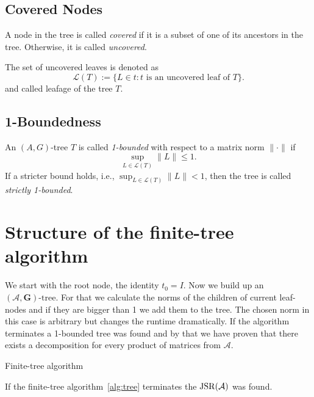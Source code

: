 \subsection*{Covered Nodes}
A node in the tree is called \textit{covered} if it is a subset of one of its ancestors in the tree. Otherwise, it is called \textit{uncovered}. 

\begin{definition}
    The set of uncovered leaves is denoted as
\[
    \mathcal{L}(T) := \{ L \in t : t \text{ is an uncovered leaf of } T \}.
\]
and called leafage of the tree $T$.
\end{definition}

\subsection*{1-Boundedness}
An \( (A,G) \)-tree $T$ is called \textit{1-bounded} with respect to a matrix norm \( \| \cdot \| \) if
\[
    \sup_{L \in \mathcal{L}(T)} \| L \| \leq 1.
\]
If a stricter bound holds, i.e., \( \sup_{L \in \mathcal{L}(T)} \| L \| < 1 \), then the tree is called \emph{strictly 1-bounded}.

\section{Structure of the finite-tree algorithm}
We start with the root node, the identity $t_0 = {I}$. Now we build up an $(\mathcal{A},\mathbf{G})\text{-tree}$.
For that we calculate the norms of the children of current leaf-nodes and if they are bigger than 1 we add them to the tree. 
The chosen norm in this case is arbitrary but changes the runtime dramatically. 
If the algorithm terminates a 1-bounded tree was found and by that we have proven that there exists a decomposition for every product of matrices from $\mathcal{A}$. 

\vspace{1cm}

\begin{algorithm}
    \caption{Finite-tree algorithm}
    \label{alg:tree}
\end{algorithm}

\vspace{1cm}

\begin{theorem}
    If the finite-tree algorithm~\ref{alg:tree} terminates the $\operatorname{JSR}(\mathcal{A})$ was found. 
\end{theorem}

